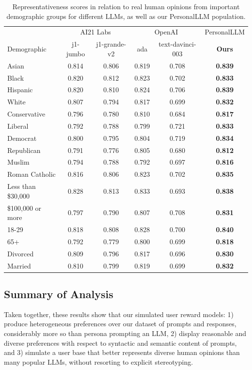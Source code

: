 \begin{table}[!ht]
    \centering
    \begin{tabular}{lccccc}
    \toprule
     & \multicolumn{2}{c}{AI21 Labs} & \multicolumn{2}{c}{OpenAI} & \textsf{PersonalLLM} \\
    Demographic & j1-jumbo & j1-grande-v2 & ada & text-davinci-003 & \textbf{Ours} \\
    \midrule
    Asian & 0.814 & 0.806 & 0.819 & 0.708 & \textbf{0.839} \\
    Black & 0.820 & 0.812 & 0.823 & 0.702 & \textbf{0.833} \\
    Hispanic & 0.820 & 0.810 & 0.824 & 0.706 & \textbf{0.839} \\
    White & 0.807 & 0.794 & 0.817 & 0.699 & \textbf{0.832} \\
    Conservative & 0.796 & 0.780 & 0.810 & 0.684 & \textbf{0.817} \\
    Liberal & 0.792 & 0.788 & 0.799 & 0.721 & \textbf{0.833} \\
    Democrat & 0.800 & 0.795 & 0.804 & 0.719 & \textbf{0.834} \\
    Republican & 0.791 & 0.776 & 0.805 & 0.680 & \textbf{0.812} \\
    Muslim & 0.794 & 0.788 & 0.792 & 0.697 & \textbf{0.816} \\
    Roman Catholic & 0.816 & 0.806 & 0.823 & 0.702 & \textbf{0.835} \\
    Less than \$30,000 & 0.828 & 0.813 & 0.833 & 0.693 & \textbf{0.838} \\
    \$100,000 or more & 0.797 & 0.790 & 0.807 & 0.708 & \textbf{0.831} \\
    18-29 & 0.818 & 0.808 & 0.828 & 0.700 & \textbf{0.840} \\
    65+ & 0.792 & 0.779 & 0.800 & 0.699 & \textbf{0.818} \\
    Divorced & 0.809 & 0.796 & 0.817 & 0.696 & \textbf{0.830} \\
    Married & 0.810 & 0.799 & 0.819 & 0.699 & \textbf{0.832} \\
    \bottomrule
    \end{tabular}
    \caption{Representativeness scores in relation to real human opinions from important demographic groups for different LLMs, as well as our \textsf{PersonalLLM} population.}
    \label{tab:opinion_qa}
\end{table}

\subsection{Summary of Analysis}

Taken together, these results show that our simulated user reward models: 1) produce heterogeneous preferences over our dataset of prompts and responses, considerably more so than persona prompting an LLM, 2) display reasonable and diverse preferences with respect to syntactic and semantic content of prompts, and 3) simulate a user base that better represents diverse human opinions than many popular LLMs, without resorting to explicit stereotyping.


